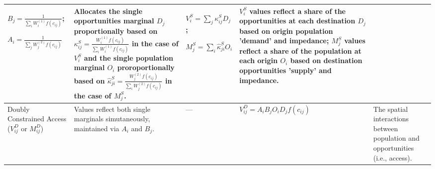 {\begin{longtable}{|p{2.5cm}|p{2.5cm}|p{2.5cm}|p{3cm}|p{3cm}|}
$B_j = \frac{1}{\sum_i W_i^{(1)} f(c_{ij})}$;

$A_i = \frac{1}{\sum_j W_j^{(2)} f(c_{ij})}$

& Allocates the single opportunities marginal $D_j$ proportionally based on $\kappa^S_{ij} =  \frac{W_i^{(1)} f(c_{ij})}{\sum_i W_i^{(1)} f(c_{ij})}$ in the case of $V_i^S$ and the single population marginal $O_i$ proroportionally based on $\hat \kappa^S_{ji} = \frac{W_j^{(2)} f(c_{ij})}{\sum_i W_j^{(2)} f(c_{ij})}$ in the case of $M_j^S$.

& $V^S_i = \sum_j \kappa^S_{ij} D_j$;

$M_j^S =  \sum_i \hat \kappa^S_{ji} O_i$

& $V^S_i$ values reflect a share of the opportunities at each destination $D_j$ based on origin population 'demand' and impedance; $M^S_j$ values reflect a share of the population at each origin $O_i$ based on destination opportunities 'supply' and impedance.\\
\hline

Doubly Constrained Access ($V_{ij}^D$ or $M_{ij}^D$)
& Values reflect both single marginals simutaneously, maintained via $A_i$ and $B_j$.
& —
& $V_{ij}^D = A_i B_j O_i D_j f(c_{ij})$
& The spatial interactions between population and opportunities (i.e., access). \\
\hline

\end{longtable}
}
